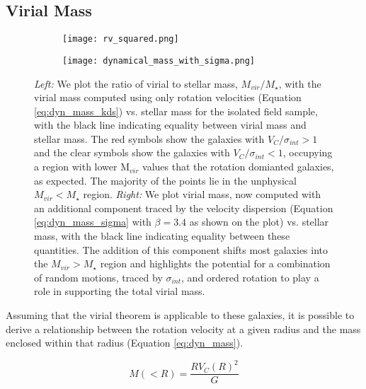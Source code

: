 \documentclass[a4paper,fleqn,usenatbib]{mn2e}
\begin{document}
\subsection{Virial Mass}\label{subsec:dynamical_masses}

\begin{figure*}
    \centering \hspace{-1.3cm}
    \begin{subfigure}[h!]{0.5\textwidth}
        \centering
        \texttt{[image: rv\_squared.png]}
    \end{subfigure} \hspace{+0.4cm}
    \begin{subfigure}[h!]{0.5\textwidth}
        \centering
        \texttt{[image: dynamical\_mass\_with\_sigma.png]}
    \end{subfigure}
    \caption{{\it Left:} We plot the ratio of virial to stellar mass, $M_{vir}/M_{\star}$, with the virial mass computed using only rotation velocities (Equation \protect\ref{eq:dyn_mass_kds}) vs. stellar mass for the isolated field sample, with the black line indicating equality between virial mass and stellar mass.
    The red symbols show the galaxies with $V_{C}/\sigma_{int} > 1$ and the clear symbols show the galaxies with $V_{C}/\sigma_{int} < 1$, occupying a region with lower M$_{vir}$ values that the rotation domianted galaxies, as expected.
    The majority of the points lie in the unphysical $M_{vir} < M_{\star}$ region.
    {\it Right:} We plot virial mass, now computed with an additional component traced by the velocity dispersion (Equation \protect\ref{eq:dyn_mass_sigma} with $\beta=3.4$ as shown on the plot) vs. stellar mass, with the black line indicating equality between these quantities.
    The addition of this component shifts most galaxies into the $M_{vir} > M_{\star}$ region and highlights the potential for a combination of random motions, traced by $\sigma_{int}$, and ordered rotation to play a role in supporting the total virial mass.}
    \label{fig:dyn_masses}
\end{figure*}

Assuming that the virial theorem is applicable to these galaxies, it is possible to derive a relationship between the rotation velocity at a given radius and the mass enclosed within that radius (Equation \ref{eq:dyn_mass}). 

\begin{equation}\label{eq:dyn_mass}
   M\left(<R\right) = \frac{RV_{C}(R)^{2}}{G}
\end{equation}
\end{document}
